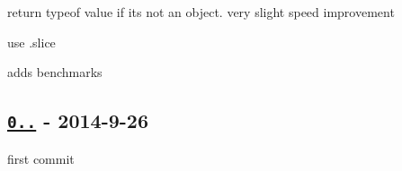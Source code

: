 \begin{DoxyItemize}
\item return {\ttfamily typeof} value if it\textquotesingle{}s not an object. very slight speed improvement
\item use {\ttfamily .slice}
\item adds benchmarks
\end{DoxyItemize}

\subsection*{\href{https://github.com/jonschlinkert/kind-of/commit/2fae09b0b19b1aadb558e9be39f0c3ef6034eb87}{\tt 0..} -\/ 2014-\/9-\/26}


\begin{DoxyItemize}
\item first commit 
\end{DoxyItemize}